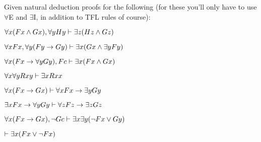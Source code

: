 \problempart Given natural deduction proofs for the following (for these you'll only have to use $\forall$E and $\exists$I, in addition to TFL rules of course):


\begin{earg}
\item $\forall x(Fx \wedge Gx), \forall yHy \vdash \exists z(Hz \wedge Gz)$
\item $\forall xFx, \forall y (Fy \rightarrow Gy) \vdash \exists x(Gx \wedge \exists yFy)$
\item $\forall x(Fx \rightarrow \forall yGy), Fc \vdash \exists x(Fx \wedge Gx)$
\item $\forall x \forall y Rxy \vdash \exists x Rxx$
\item $\forall x(Fx \rightarrow Gx) \vdash \forall xFx \rightarrow \exists yGy$
\item $\exists xFx \rightarrow \forall y Gy \vdash \forall z Fz \rightarrow \exists zGz$
\item $\forall x(Fx \rightarrow Gx), \neg Gc \vdash \exists x\exists y(\neg Fx \vee Gy)$
\item $\vdash \exists x(Fx \vee \neg Fx)$
\end{earg}




